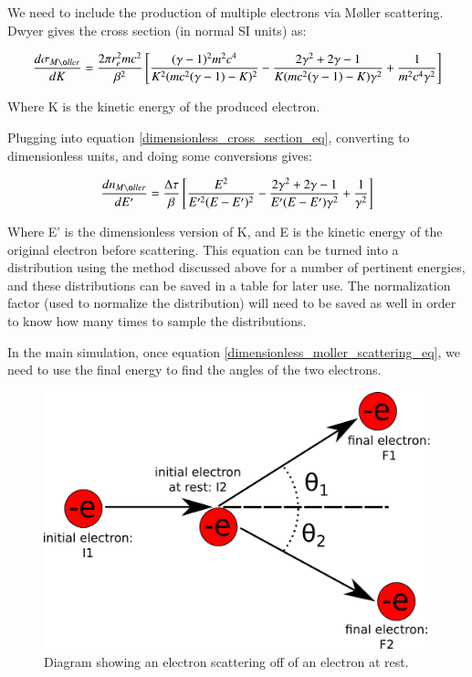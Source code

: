 \documentclass[]{article}
\begin{document}
We need to include the production of multiple electrons via M\o ller scattering. Dwyer gives the cross section (in normal SI units) as:

\begin{equation} 
\frac{d\sigma_{M\o ller}}{d K} = \frac{2\pi r_e^2 m c^2}{\beta^2}\left[  \frac{(\gamma-1)^2m^2c^4}{K^2(mc^2(\gamma-1)-K)^2} - \frac{2\gamma^2 + 2\gamma -1}{K(mc^2(\gamma-1)-K)\gamma^2}  + \frac{1}{m^2c^4\gamma^2}  \right]
\end{equation}

Where K is the kinetic energy of the produced electron.

Plugging into equation \ref{dimensionless_cross_section_eq}, converting to dimensionless units, and doing some conversions gives:

\begin{equation} 
\label{dimensionless_moller_scattering_eq}
\frac{dn_{M\o ller}}{d E'} = \frac{\Delta \tau}{\beta}\left[  \frac{E^2}{E'^2(E-E')^2} - \frac{2\gamma^2 + 2\gamma -1}{E'(E-E')\gamma^2}  + \frac{1}{\gamma^2}  \right]
\end{equation}

Where E' is the dimensionless version of K, and E is the kinetic energy of the original electron before scattering. This equation can be turned into a distribution using the method discussed above for a number of pertinent energies, and these distributions can be saved in a table for later use. The normalization factor (used to normalize the distribution) will need to be saved as well in order to know how many times to sample the distributions.

In the main simulation, once equation \ref{dimensionless_moller_scattering_eq}, we need to use the final energy to find the angles of the two electrons.

\begin{figure}
\centering
\includegraphics[width=0.7\linewidth]{./scattering_kinematics}
\caption{Diagram showing an electron scattering off of an electron at rest.}
\label{scattering_kin_fig}
\end{figure}
\end{document}
